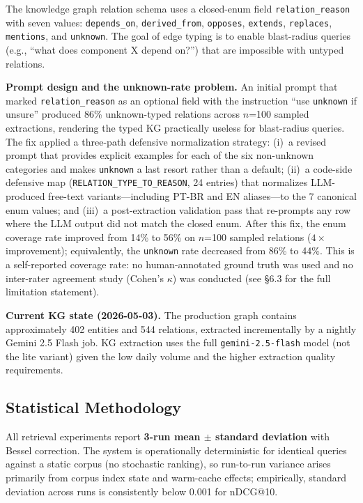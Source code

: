 The knowledge graph relation schema uses a closed-enum field \texttt{relation\_reason}
with seven values: \texttt{depends\_on}, \texttt{derived\_from}, \texttt{opposes},
\texttt{extends}, \texttt{replaces}, \texttt{mentions}, and \texttt{unknown}. The goal of
edge typing is to enable blast-radius queries (e.g., ``what does component X depend on?'')
that are impossible with untyped relations.

\textbf{Prompt design and the unknown-rate problem.} An initial prompt that marked
\texttt{relation\_reason} as an optional field with the instruction ``use \texttt{unknown}
if unsure'' produced 86\% unknown-typed relations across $n$=100 sampled extractions,
rendering the typed KG practically useless for blast-radius queries. The fix applied a
three-path defensive normalization strategy: (i)~a revised prompt that provides explicit
examples for each of the six non-unknown categories and makes \texttt{unknown} a last
resort rather than a default; (ii)~a code-side defensive map
(\texttt{RELATION\_TYPE\_TO\_REASON}, 24 entries) that normalizes LLM-produced free-text
variants---including PT-BR and EN aliases---to the 7 canonical enum values; and (iii)~a
post-extraction validation pass that re-prompts any row where the LLM output did not match
the closed enum. After this fix, the enum coverage rate improved from 14\% to 56\% on
$n$=100 sampled relations ($4\times$ improvement); equivalently, the \texttt{unknown} rate
decreased from 86\% to 44\%. This is a self-reported coverage rate: no human-annotated
ground truth was used and no inter-rater agreement study (Cohen's $\kappa$) was conducted
(see \S6.3 for the full limitation statement).

\textbf{Current KG state (2026-05-03).} The production graph contains approximately 402
entities and 544 relations, extracted incrementally by a nightly Gemini 2.5 Flash job. KG
extraction uses the full \texttt{gemini-2.5-flash} model (not the lite variant) given the
low daily volume and the higher extraction quality requirements.

\FloatBarrier
\subsection{Statistical Methodology}

All retrieval experiments report \textbf{3-run mean $\pm$ standard deviation} with Bessel
correction. The system is operationally deterministic for identical queries against a
static corpus (no stochastic ranking), so run-to-run variance arises primarily from corpus
index state and warm-cache effects; empirically, standard deviation across runs is
consistently below 0.001 for nDCG@10.

